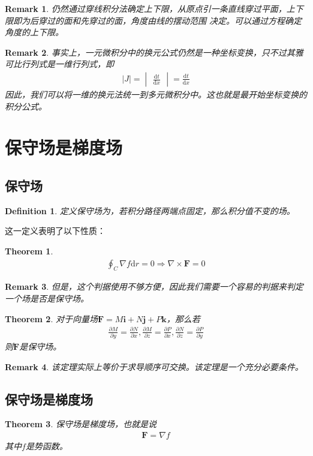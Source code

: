 \documentclass[12pt,a4paper,UTF8]{ctexbook}
\theoremstyle{plain}
\newtheorem{theorem}{\indent Theorem}[section]
\newtheorem{definition}{\indent Definition}[section]
\newtheorem{remark}{\indent Remark}[section]
\newcommand{\vb}[1]{\mathbf{#1}}          %
\begin{document}
\begin{remark}
    仍然通过穿线积分法确定上下限，从原点引一条直线穿过平面，上下限即为后穿过的面和先穿过的面，角度由线的摆动范围
    决定。可以通过方程确定角度的上下限。
\end{remark}
\begin{remark}
    事实上，一元微积分中的换元公式仍然是一种坐标变换，只不过其雅可比行列式是一维行列式，即
    \begin{align*} 
        |J|=\begin{vmatrix}\frac{\mathrm dt}{\mathrm dx}\end{vmatrix}=\frac{\mathrm d t}{\mathrm d x}
    \end{align*} 
    因此，我们可以将一维的换元法统一到多元微积分中。这也就是最开始坐标变换的积分公式。
\end{remark}
\section{保守场是梯度场}
\subsection{保守场}
\begin{definition}
    定义保守场为，若积分路径两端点固定，那么积分值不变的场。
\end{definition}
这一定义表明了以下性质：
\begin{theorem} 
    \begin{align*} 
        \oint_C \nabla f\mathrm d r=0 \Rightarrow \nabla \times \vb{F}=0
    \end{align*}
\end{theorem}
\begin{remark} 
    但是，这个判据使用不够方便，因此我们需要一个容易的判据来判定一个场是否是保守场。
\end{remark}
\begin{theorem}
    对于向量场$\vb{F} = M \vb{i} + N \vb{j} + P \vb{k}$，那么若
    \begin{align*} 
        \frac{\partial M}{\partial y}=\frac{\partial N}{\partial x},\frac{\partial M}{\partial z}=\frac{\partial P}{\partial x},\frac{\partial N}{\partial z}=\frac{\partial P}{\partial y}
    \end{align*}
    则$\vb{F}$是保守场。
\end{theorem}
\begin{remark}
    该定理实际上等价于求导顺序可交换。该定理是一个充分必要条件。
\end{remark}
\subsection{保守场是梯度场}
\begin{theorem} 
    保守场是梯度场，也就是说
    \begin{align*} 
        \vb{F} =\nabla f 
    \end{align*}
    其中$f$是势函数。
\end{theorem}
\end{document}
